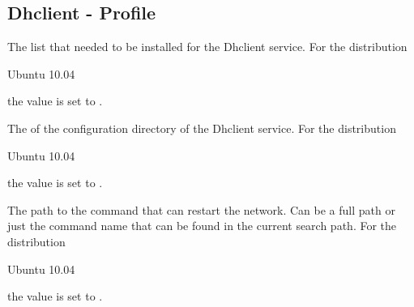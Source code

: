 \label{sec:dhclient_profile}
\subsection{Dhclient - Profile}


The  list that needed to be installed for the Dhclient service.
For the distribution
\begin{inparaitem}
\item[\TheDistribution{ubuntu}] Ubuntu 10.04
\end{inparaitem}
the value is set to .


The  of the configuration directory of the Dhclient service. 
For the distribution
\begin{inparaitem}
\item[\TheDistribution{ubuntu}] Ubuntu 10.04
\end{inparaitem}
the value is set to .


The  path to the command that can restart the network. Can be a full path or
just the command name that can be found in the current search path.
For the distribution
\begin{inparaitem}
\item[\TheDistribution{ubuntu}] Ubuntu 10.04
\end{inparaitem}
the value is set to .

